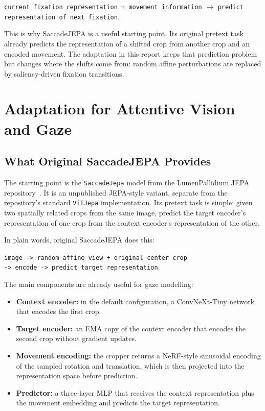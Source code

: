 \documentclass[12pt,a4paper]{article}
\begin{document}
\begin{center}
\texttt{current fixation representation + movement information}
$\rightarrow$
\texttt{predict representation of next fixation}.
\end{center}

This is why SaccadeJEPA is a useful starting point. Its original pretext task
already predicts the representation of a shifted crop from another crop and an
encoded movement. The adaptation in this report keeps that prediction problem
but changes where the shifts come from: random affine perturbations are
replaced by saliency-driven fixation transitions.
\section{Adaptation for Attentive Vision and Gaze}
\label{sec:saccade}

\subsection{What Original SaccadeJEPA Provides}
\label{subsec:saccade-overview}

The starting point is the \texttt{SaccadeJepa} model from the LumenPallidium
JEPA repository~\cite{lumenpallidium2024jepa}. It is an unpublished JEPA-style
variant, separate from the repository's standard \texttt{ViTJepa}
implementation. Its pretext task is simple: given two spatially related crops
from the same image, predict the target encoder's representation of one crop
from the context encoder's representation of the other.

In plain words, original SaccadeJEPA does this:

\begin{center}
\texttt{image -> random affine view + original center crop}\\
\texttt{-> encode -> predict target representation}.
\end{center}

The main components are already useful for gaze modelling:

\begin{itemize}
  \item \textbf{Context encoder:} in the default configuration, a
        ConvNeXt-Tiny network that encodes the first crop.
  \item \textbf{Target encoder:} an EMA copy of the context encoder that
        encodes the second crop without gradient updates.
  \item \textbf{Movement encoding:} the cropper returns a NeRF-style
        sinusoidal encoding of the sampled rotation and translation, which is
        then projected into the representation space before prediction.
  \item \textbf{Predictor:} a three-layer MLP that receives the context
        representation plus the movement embedding and predicts the target
        representation.
\end{itemize}
\end{document}
